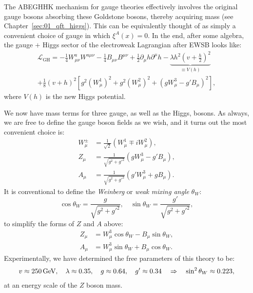 The ABEGHHK mechanism for gauge theories effectively involves the original gauge bosons absorbing these Goldstone bosons, thereby acquiring mass (see Chapter~\ref{sec:01_qft_higgs}).
This can be equivalently thought of as simply a convenient choice of gauge in which $\xi^A(x) = 0$.
In the end, after some algebra, the gauge $+$ Higgs sector of the electroweak Lagrangian after EWSB looks like:
\begin{multline}
	\label{eq:01_sm_ew_gauge_lagrangian}
	\mathcal{L}_{\mathrm{GH}} = -\frac{1}{4} W^a_{\mu\nu} W^{a\mu\nu} - \frac{1}{4} B_{\mu\nu} B^{\mu\nu} + \frac{1}{2}\partial_\mu h \partial^\mu h - \underbrace{\lambda h^2 \left(v + \frac{h}{2}\right)^2}_{\equiv V(h)} \\
	+ \frac{1}{8} (v + h)^2 \left[g^2 (W^1_\mu)^2 + g^2 (W^2_\mu)^2 + (g W^3_\mu - g' B_\mu)^2\right],
\end{multline}
where $V(h)$ is the new Higgs potential.

We now have mass terms for three gauge, as well as the Higgs, bosons.
As always, we are free to define the gauge boson fields as we wish, and it turns out the most convenient choice is:
\begin{equation}
	\label{eq:01_sm_ew_gauge_fields}
	\begin{split}
		W^\pm_\mu &= \frac{1}{\sqrt{2}} (W^1_\mu \mp i W^2_\mu), \\
		Z_\mu &= \frac{1}{\sqrt{g^2 + g'^2}} (g W^3_\mu - g' B_\mu), \\
		A_\mu &= \frac{1}{\sqrt{g^2 + g'^2}} (g' W^3_\mu + g B_\mu).
	\end{split}
\end{equation}
It is conventional to define the \textit{Weinberg} or \textit{weak mixing angle} $\theta_W$:
\begin{equation}
	\label{eq:01_sm_ew_weinberg}
	\cos \theta_W = \frac{g}{\sqrt{g^2 + g'^2}}, \quad \sin \theta_W = \frac{g'}{\sqrt{g^2 + g'^2}},
\end{equation}
to simplify the forms of $Z$ and $A$ above:
\begin{equation}
	\label{eq:01_sm_ew_z_a}
	\begin{split}
		Z_\mu &= W^3_\mu \cos \theta_W - B_\mu \sin \theta_W, \\
		A_\mu &= W^3_\mu \sin \theta_W + B_\mu \cos \theta_W.
	\end{split}
\end{equation}
Experimentally, we have determined the free parameters of this theory to be:
\begin{equation}
	\label{eq:01_sm_ew_constants}
		v \approx 250\,\text{Ge\hspace{-.08em}V}, \quad \lambda \approx 0.35, \quad g \approx 0.64, \quad g' \approx 0.34 \quad \Rightarrow \quad \sin^2 \theta_W \approx 0.223,
\end{equation}
at an energy scale of the $Z$ boson mass.

